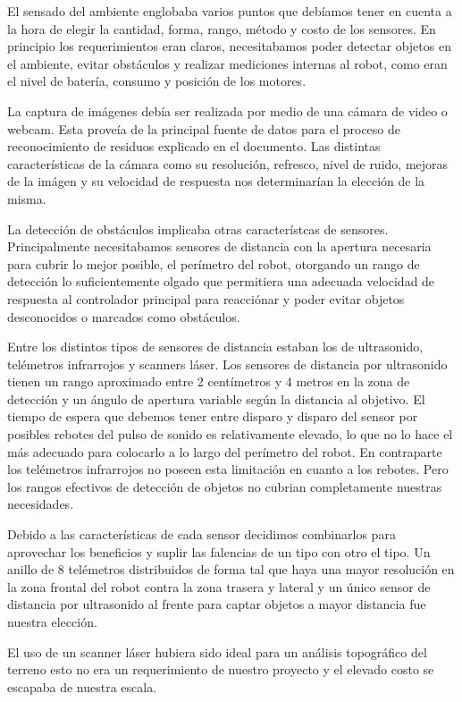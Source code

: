 El sensado del ambiente englobaba varios puntos que deb\'iamos tener en cuenta a la hora de elegir
la cantidad, forma, rango, m\'etodo y costo de los sensores.
En principio los requerimientos eran claros, necesitabamos poder detectar objetos en el ambiente,
evitar obst\'aculos y realizar mediciones internas al robot, como eran el nivel de bater\'ia,
consumo y posici\'on de los motores.

La captura de im\'agenes deb\'ia ser realizada por medio de una c\'amara de video o webcam.
Esta prove\'ia de la principal fuente de datos para el proceso de reconocimiento de residuos
explicado en el documento.
Las distintas caracter\'isticas de la c\'amara como su resoluci\'on, refresco, nivel de ruido,
mejoras de la im\'agen y su velocidad de respuesta nos determinar\'ian la elecci\'on de la misma.

La detecci\'on de obst\'aculos implicaba otras caracter\'istcas de sensores.
Principalmente necesitabamos sensores de distancia con la apertura necesaria para cubrir lo
mejor posible, el per\'imetro del robot, otorgando un rango de detecci\'on lo suficientemente olgado
que permitiera una adecuada velocidad de respuesta al controlador principal para reacci\'onar y poder
evitar objetos desconocidos o marcados como obst\'aculos.

Entre los distintos tipos de sensores de distancia estaban los de ultrasonido, tel\'emetros infrarrojos
y scanners l\'aser.
Los sensores de distancia por ultrasonido tienen un rango aproximado entre 2 cent\'imetros y 4 metros
en la zona de detecci\'on y un \'angulo de apertura variable seg\'un la distancia al objetivo.
El tiempo de espera que debemos tener entre disparo y disparo del sensor por posibles rebotes del pulso
de sonido es relativamente elevado, lo que no lo hace el m\'as adecuado para colocarlo a lo largo del
per\'imetro del robot.
En contraparte los tel\'emetros infrarrojos no poseen esta limitaci\'on en cuanto a los rebotes.
Pero los rangos efectivos de detecci\'on de objetos no cubrian completamente nuestras necesidades.

Debido a las caracter\'isticas de cada sensor decidimos combinarlos para aprovechar los beneficios y
suplir las falencias de un tipo con otro el tipo.
Un anillo de 8 tel\'emetros distribuidos de forma tal que haya una mayor resoluci\'on en la zona frontal
del robot contra la zona trasera y lateral y un \'unico sensor de distancia por ultrasonido al frente
para captar objetos a mayor distancia fue nuestra elecci\'on.

El uso de un scanner l\'aser hubiera sido ideal para un an\'alisis topogr\'afico del terreno esto no era
un requerimiento de nuestro proyecto y el elevado costo se escapaba de nuestra escala.

